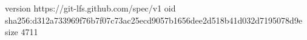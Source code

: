 version https://git-lfs.github.com/spec/v1
oid sha256:d312a733969f76b7f07c73ac25ecd9057b1656dee2d518b41d032d7195078d9e
size 4711
